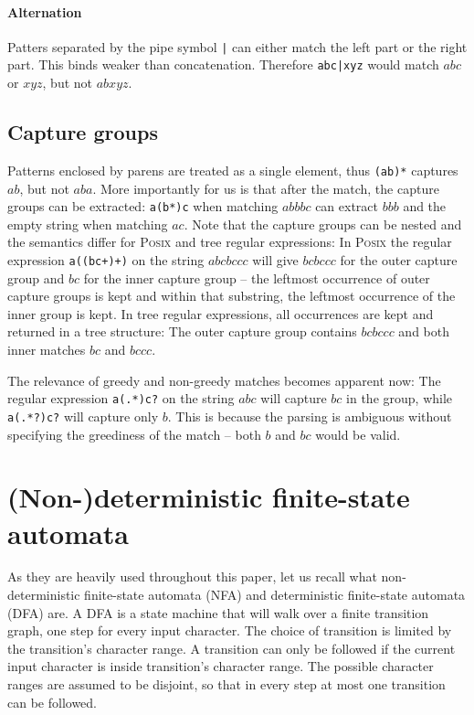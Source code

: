 \documentclass[11pt]{Thesis}
\theoremstyle{definition}
\begin{document}
\paragraph{Alternation} Patters separated by the pipe symbol \texttt{|} can 
either match the left part or the right part. This binds weaker than 
concatenation. Therefore \texttt{abc|xyz} would match $abc$ or $xyz$, but not
$abxyz$.

\subsection{Capture groups}
Patterns enclosed by parens are treated as a single element, thus
\texttt{(ab)*} captures $ab$, but not $aba$. More importantly for us is that
after the match, the capture groups can be extracted: \texttt{a(b*)c} when
matching $abbbc$ can extract $bbb$ and the empty string when matching $ac$.
Note that the capture groups can be nested and the semantics differ for
\textsc{Posix} and tree regular expressions: In \textsc{Posix} the regular expression
\texttt{a((bc+)+)} on the string $abcbccc$ will give $bcbccc$ for the outer
capture group and $bc$ for the inner capture group -- the leftmost occurrence of
outer capture groups is kept and within that substring, the leftmost occurrence
of the inner group is kept. In tree regular expressions, all occurrences are kept and returned
in a tree structure: The outer capture group contains $bcbccc$ and both inner
matches $bc$ and $bccc$.

The relevance of greedy and non-greedy matches becomes apparent now: The
regular expression \texttt{a(.*)c?} on the string $abc$ will capture $bc$ in
the group, while \texttt{a(.*?)c?} will capture only $b$. This is because 
the parsing is ambiguous without specifying the greediness of the match -- both
$b$ and $bc$ would be valid.

\section{(Non-)deterministic finite-state automata}
As they are heavily used throughout this paper, let us recall what
non-deterministic finite-state automata (NFA) and deterministic finite-state
automata (DFA) are. A DFA is a state machine that will walk over a finite
transition graph, one step for every input character. The choice of transition
is limited by the transition's character range. A transition can only be
followed if the current input character is inside transition's character 
range. The possible character ranges are assumed to be disjoint, so that in 
every step at most one transition can be followed.
\end{document}
